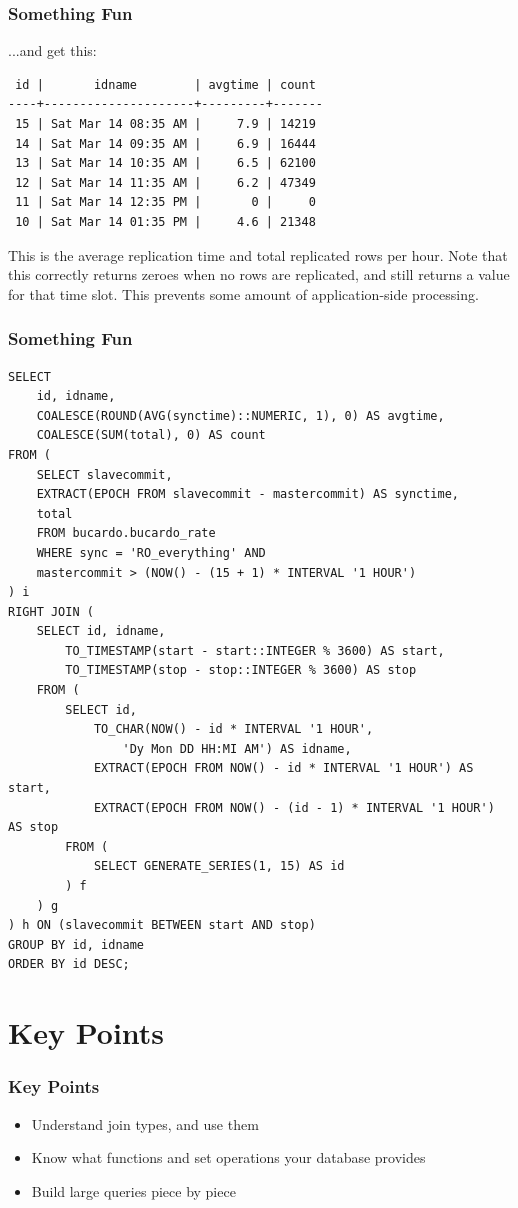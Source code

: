 \documentclass{beamer}
\begin{document}
\begin{frame}[fragile]
    \frametitle{Something Fun}
    ...and get this:
    \begin{verbatim}
 id |       idname        | avgtime | count
----+---------------------+---------+-------
 15 | Sat Mar 14 08:35 AM |     7.9 | 14219
 14 | Sat Mar 14 09:35 AM |     6.9 | 16444
 13 | Sat Mar 14 10:35 AM |     6.5 | 62100
 12 | Sat Mar 14 11:35 AM |     6.2 | 47349
 11 | Sat Mar 14 12:35 PM |       0 |     0
 10 | Sat Mar 14 01:35 PM |     4.6 | 21348
    \end{verbatim}
    This is the average replication time and total replicated rows per hour.
    Note that this correctly returns zeroes when no rows are replicated, and
    still returns a value for that time slot. This prevents some amount of
    application-side processing.
\end{frame}

\begin{frame}
    \frametitle{Something Fun}
\end{frame}

\begin{frame}[fragile]
    \tiny
    \begin{verbatim}
SELECT
    id, idname,
    COALESCE(ROUND(AVG(synctime)::NUMERIC, 1), 0) AS avgtime,
    COALESCE(SUM(total), 0) AS count
FROM (
    SELECT slavecommit,
    EXTRACT(EPOCH FROM slavecommit - mastercommit) AS synctime,
    total
    FROM bucardo.bucardo_rate
    WHERE sync = 'RO_everything' AND
    mastercommit > (NOW() - (15 + 1) * INTERVAL '1 HOUR')
) i
RIGHT JOIN (
    SELECT id, idname,
        TO_TIMESTAMP(start - start::INTEGER % 3600) AS start,
        TO_TIMESTAMP(stop - stop::INTEGER % 3600) AS stop
    FROM (
        SELECT id,
            TO_CHAR(NOW() - id * INTERVAL '1 HOUR', 
                'Dy Mon DD HH:MI AM') AS idname,
            EXTRACT(EPOCH FROM NOW() - id * INTERVAL '1 HOUR') AS start,
            EXTRACT(EPOCH FROM NOW() - (id - 1) * INTERVAL '1 HOUR') AS stop
        FROM (
            SELECT GENERATE_SERIES(1, 15) AS id
        ) f
    ) g
) h ON (slavecommit BETWEEN start AND stop)
GROUP BY id, idname
ORDER BY id DESC;
    \end{verbatim}
\end{frame}

\section{Key Points}
\begin{frame}
    \frametitle{Key Points}
    \begin{itemize}
        \item Understand join types, and use them
        \pause
        \item Know what functions and set operations your database provides
        \pause
        \item Build large queries piece by piece
    \end{itemize}
\end{frame}

\end{document}
